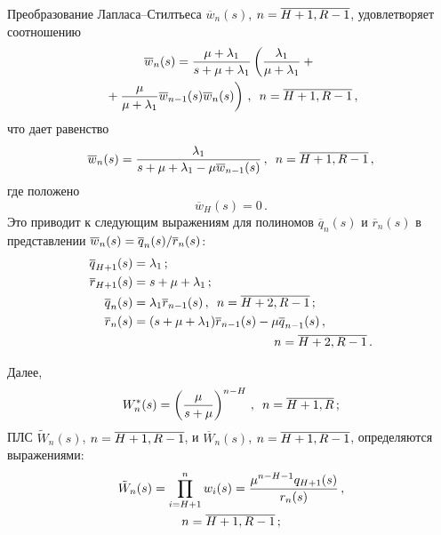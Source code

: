 \begin{multicols}{2}
Преобразование Лап\-ла\-са--Стилть\-еса $\overline{w}_{n}(s)$, $n\hm=\overline{H+1,R-1}$, удовлетворяет соотношению
\begin{multline*}
\overline{w}_{n}(s) = \displaystyle\frac{\displaystyle \mu+\lambda_1\mathstrut}{\displaystyle s + \mu+\lambda_1\mathstrut} 
\left ( \displaystyle\frac{\displaystyle \lambda_1\mathstrut}{\displaystyle \mu+\lambda_1\mathstrut} +{}\right.\\
\left.{}+\displaystyle\frac{\displaystyle \mu\mathstrut}{\displaystyle \mu+\lambda_1\mathstrut} \overline{w}_{n-1}(s) \overline{w}_{n}(s) \right)\,,\enskip
n=\overline{H+1,R-1}\,,
\end{multline*}
что дает равенство
\begin{equation*}
\overline{w}_{n}(s) = \displaystyle\frac{\displaystyle \lambda_1\mathstrut}{\displaystyle s + \mu + \lambda_1 - \mu \overline{w}_{n-1}(s)\mathstrut} \,,\enskip
n=\overline{H+1,R-1}\,,
\end{equation*}
где положено
\begin{equation*}
\overline{w}_{H}(s) = 0\,.
\end{equation*}
Это приводит к следующим выражениям для полиномов $\overline{q}_n(s)$ и
$\overline{r}_n(s)$ в представлении $\overline{w}_n(s)\hm=\overline{q}_n(s)/\overline{r}_n(s)$:
\begin{align*}
\overline{q}_{H+1}(s) &= \lambda_1 \,;
\\
\overline{r}_{H+1}(s) &= s + \mu + \lambda_1\,;
\\
\overline{q}_{n}(s) &= \lambda_1 \overline{r}_{n-1}(s)\,,\enskip n=\overline{H+2,R-1}\,;
\\
\overline{r}_{n}(s) &= (s + \mu + \lambda_1) \overline{r}_{n-1}(s) - \mu \overline{q}_{n-1}(s)\,,\\ 
&\hspace*{40mm}n=\overline{H+2,R-1}\,.
\end{align*}

Далее,
\begin{equation*}
W^*_n(s) = \left(\displaystyle\frac{\displaystyle \mu\mathstrut}{\displaystyle s + \mu\mathstrut}\right)^{n-H} \,,\enskip n=\overline{H+1,R}\,;
\end{equation*}
ПЛС $\tilde{W}_{n}(s)$, $n\hm=\overline{H+1,R-1}$, и
$\overline{W}_{n}(s)$, $n\hm=\overline{H+1,R-1}$,
определяются выражениями:
\begin{multline*}
\tilde{W}_{n}(s) = \prod\limits_{i=H+1}^{n} w_{i}(s) =
\displaystyle\frac{\displaystyle \mu^{n-H-1} q_{H+1}(s)\mathstrut}{\displaystyle r_{n}(s)\mathstrut}\,,
\\ n=\overline{H+1,R-1}\,;
\end{multline*}
\vspace*{-12pt}


\end{multicols}
